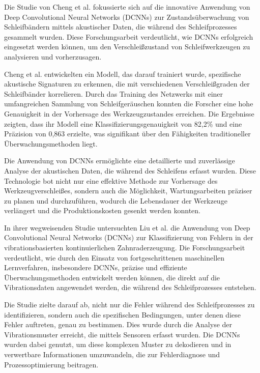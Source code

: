Die Studie von Cheng et al. \cite{Cheng2018} fokussierte sich auf die innovative Anwendung von Deep Convolutional Neural Networks (DCNNs) zur Zustandsüberwachung von Schleifbändern mittels akustischer Daten, die während des Schleifprozesses gesammelt wurden. Diese Forschungsarbeit verdeutlicht, wie DCNNs erfolgreich eingesetzt werden können, um den Verschleißzustand von Schleifwerkzeugen zu analysieren und vorherzusagen.

Cheng et al. entwickelten ein Modell, das darauf trainiert wurde, spezifische akustische Signaturen zu erkennen, die mit verschiedenen Verschleißgraden der Schleifbänder korrelieren. Durch das Training des Netzwerks mit einer umfangreichen Sammlung von Schleifgeräuschen konnten die Forscher eine hohe Genauigkeit in der Vorhersage des Werkzeugzustandes erreichen. Die Ergebnisse zeigten, dass ihr Modell eine Klassifizierungsgenauigkeit von 82,2\% und eine Präzision von 0,863 erzielte, was signifikant über den Fähigkeiten traditioneller Überwachungsmethoden liegt.

Die Anwendung von DCNNs ermöglichte eine detaillierte und zuverlässige Analyse der akustischen Daten, die während des Schleifens erfasst wurden. Diese Technologie bot nicht nur eine effektive Methode zur Vorhersage des Werkzeugverschleißes, sondern auch die Möglichkeit, Wartungsarbeiten präziser zu planen und durchzuführen, wodurch die Lebensdauer der Werkzeuge verlängert und die Produktionskosten gesenkt werden konnten.

In ihrer wegweisenden Studie untersuchten Liu et al. \cite{Liu2022} die Anwendung von Deep Convolutional Neural Networks (DCNNs) zur Klassifizierung von Fehlern in der vibrationsbasierten kontinuierlichen Zahnraderzeugung. Die Forschungsarbeit verdeutlicht, wie durch den Einsatz von fortgeschrittenen maschinellen Lernverfahren, insbesondere DCNNs, präzise und effiziente Überwachungsmethoden entwickelt werden können, die direkt auf die Vibrationsdaten angewendet werden, die während des Schleifprozesses entstehen.

Die Studie zielte darauf ab, nicht nur die Fehler während des Schleifprozesses zu identifizieren, sondern auch die spezifischen Bedingungen, unter denen diese Fehler auftreten, genau zu bestimmen. Dies wurde durch die Analyse der Vibrationsmuster erreicht, die mittels Sensoren erfasst wurden. Die DCNNs wurden dabei genutzt, um diese komplexen Muster zu dekodieren und in verwertbare Informationen umzuwandeln, die zur Fehlerdiagnose und Prozessoptimierung beitragen.

